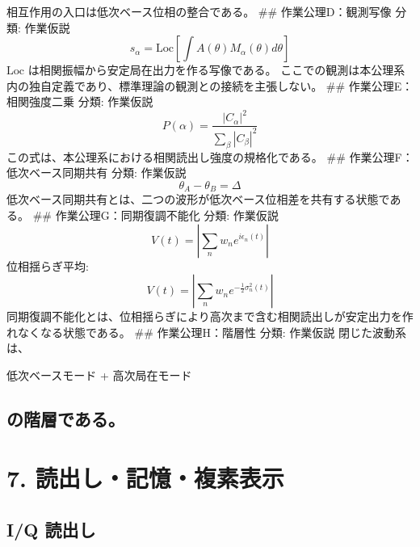 \documentclass[
  a4paper,
]{ltjsarticle}
\newenvironment{Shaded}{}{}
\newcommand{\NormalTok}[1]{#1}
\begin{document}
相互作用の入口は低次ベース位相の整合である。 \#\# 作業公理D：観測写像
分類: 作業仮説 \[
s_\alpha=\mathrm{Loc}\left[\int A(\theta)M_\alpha(\theta)d\theta\right]
\] \(\mathrm{Loc}\) は相関振幅から安定局在出力を作る写像である。
ここでの観測は本公理系内の独自定義であり、標準理論の観測との接続を主張しない。
\#\# 作業公理E：相関強度二乗 分類: 作業仮説 \[
P(\alpha)=\frac{|C_\alpha|^2}{\sum_\beta |C_\beta|^2}
\] この式は、本公理系における相関読出し強度の規格化である。 \#\#
作業公理F：低次ベース同期共有 分類: 作業仮説 \[
\theta_A-\theta_B=\Delta
\]
低次ベース同期共有とは、二つの波形が低次ベース位相差を共有する状態である。
\#\# 作業公理G：同期復調不能化 分類: 作業仮説 \[
V(t)=\left|\sum_n w_n e^{i\epsilon_n(t)}\right|
\] 位相揺らぎ平均: \[
V(t)=\left|\sum_n w_n e^{-\frac12\sigma_n^2(t)}\right|
\]
同期復調不能化とは、位相揺らぎにより高次まで含む相関読出しが安定出力を作れなくなる状態である。
\#\# 作業公理H：階層性 分類: 作業仮説 閉じた波動系は、

\begin{Shaded}
\begin{Highlighting}[]
\NormalTok{低次ベースモード}
\NormalTok{+ 高次局在モード}
\end{Highlighting}
\end{Shaded}

\subsection{の階層である。}\label{ux306eux968eux5c64ux3067ux3042ux308b}

\section{7.
読出し・記憶・複素表示}\label{ux8aadux51faux3057ux8a18ux61b6ux8907ux7d20ux8868ux793a}

\subsection{I/Q 読出し}\label{iq-ux8aadux51faux3057}
\end{document}
